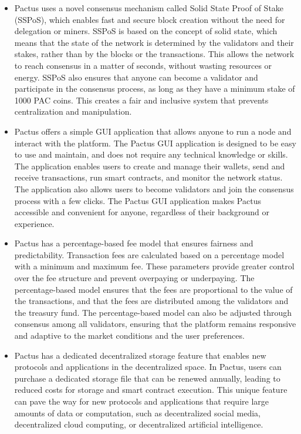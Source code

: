\documentclass{novel}
\begin{document}
\begin{itemize}
\item Pactus uses a novel consensus mechanism called Solid State Proof of Stake (SSPoS), which enables fast and secure block creation without the need for delegation or miners. SSPoS is based on the concept of solid state, which means that the state of the network is determined by the validators and their stakes, rather than by the blocks or the transactions. This allows the network to reach consensus in a matter of seconds, without wasting resources or energy. SSPoS also ensures that anyone can become a validator and participate in the consensus process, as long as they have a minimum stake of 1000 PAC coins. This creates a fair and inclusive system that prevents centralization and manipulation.
\item Pactus offers a simple GUI application that allows anyone to run a node and interact with the platform. The Pactus GUI application is designed to be easy to use and maintain, and does not require any technical knowledge or skills. The application enables users to create and manage their wallets, send and receive transactions, run smart contracts, and monitor the network status. The application also allows users to become validators and join the consensus process with a few clicks. The Pactus GUI application makes Pactus accessible and convenient for anyone, regardless of their background or experience.
\item Pactus has a percentage-based fee model that ensures fairness and predictability. Transaction fees are calculated based on a percentage model with a minimum and maximum fee. These parameters provide greater control over the fee structure and prevent overpaying or underpaying. The percentage-based model ensures that the fees are proportional to the value of the transactions, and that the fees are distributed among the validators and the treasury fund. The percentage-based model can also be adjusted through consensus among all validators, ensuring that the platform remains responsive and adaptive to the market conditions and the user preferences.
\item Pactus has a dedicated decentralized storage feature that enables new protocols and applications in the decentralized space. In Pactus, users can purchase a dedicated storage file that can be renewed annually, leading to reduced costs for storage and smart contract execution. This unique feature can pave the way for new protocols and applications that require large amounts of data or computation, such as decentralized social media, decentralized cloud computing, or decentralized artificial intelligence.
\end{itemize}
\end{document}
